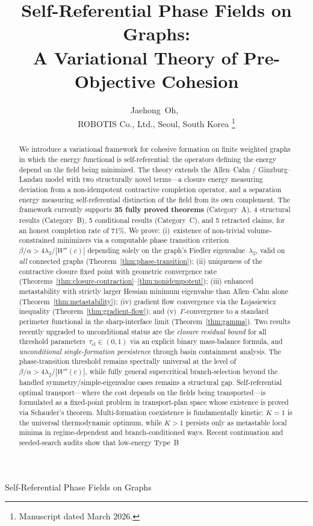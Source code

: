 \documentclass[lettersize,journal]{IEEEtran}
\begin{document}
\title{Self-Referential Phase Fields on Graphs:\\ A Variational Theory of Pre-Objective Cohesion}

\author{Jaehong~Oh,~\\
ROBOTIS Co., Ltd., Seoul, South Korea%
\thanks{Manuscript dated March 2026.}}

%
{Self-Referential Phase Fields on Graphs}

\maketitle

\begin{abstract}
We introduce a variational framework for cohesive formation on finite weighted graphs in which the energy functional is self-referential: the operators defining the energy depend on the field being minimized. The theory extends the Allen--Cahn / Ginzburg--Landau model with two structurally novel terms---a closure energy measuring deviation from a non-idempotent contractive completion operator, and a separation energy measuring self-referential distinction of the field from its own complement. The framework currently supports \textbf{35 fully proved theorems} (Category~A), 4 structural results (Category~B), 5 conditional results (Category~C), and 5 retracted claims, for an honest completion rate of 71\%. We prove: (i)~existence of non-trivial volume-constrained minimizers via a computable phase transition criterion $\beta/\alpha > 4\lambda_2/|W''(c)|$ depending solely on the graph's Fiedler eigenvalue~$\lambda_2$, valid on \emph{all} connected graphs (Theorem~\ref{thm:phase-transition}); (ii) uniqueness of the contractive closure fixed point with geometric convergence rate (Theorems~\ref{thm:closure-contraction}--\ref{thm:nonidempotent}); (iii) enhanced metastability with strictly larger Hessian minimum eigenvalue than Allen--Cahn alone (Theorem~\ref{thm:metastability}); (iv) gradient flow convergence via the \L{}ojasiewicz inequality (Theorem~\ref{thm:gradient-flow}); and (v)~$\Gamma$-convergence to a standard perimeter functional in the sharp-interface limit (Theorem~\ref{thm:gamma}). Two results recently upgraded to unconditional status are the \emph{closure residual bound} for all threshold parameters~$\tau_{\mathrm{cl}} \in (0,1)$ via an explicit binary mass-balance formula, and \emph{unconditional single-formation persistence} through basin containment analysis. The phase-transition threshold remains spectrally universal at the level of $\beta/\alpha > 4\lambda_2/|W''(c)|$, while fully general supercritical branch-selection beyond the handled symmetry/simple-eigenvalue cases remains a structural gap. Self-referential optimal transport---where the cost depends on the fields being transported---is formulated as a fixed-point problem in transport-plan space whose existence is proved via Schauder's theorem. Multi-formation coexistence is fundamentally kinetic: $K=1$ is the universal thermodynamic optimum, while $K>1$ persists only as metastable local minima in regime-dependent and branch-conditioned ways. Recent continuation and seeded-search audits show that low-energy Type~B 
\end{abstract}
\end{document}
